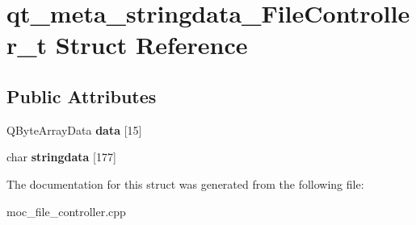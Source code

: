 \hypertarget{structqt__meta__stringdata__FileController__t}{\section{qt\-\_\-meta\-\_\-stringdata\-\_\-\-File\-Controller\-\_\-t Struct Reference}
\label{structqt__meta__stringdata__FileController__t}
}
\subsection*{Public Attributes}
\begin{DoxyCompactItemize}
\item 
\hypertarget{structqt__meta__stringdata__FileController__t_a7f037e94f93234963f2fa86545abe333}{Q\-Byte\-Array\-Data {\bfseries data} \mbox{[}15\mbox{]}}\label{structqt__meta__stringdata__FileController__t_a7f037e94f93234963f2fa86545abe333}

\item 
\hypertarget{structqt__meta__stringdata__FileController__t_a16be4e38084f14d9f9721f6619fca55d}{char {\bfseries stringdata} \mbox{[}177\mbox{]}}\label{structqt__meta__stringdata__FileController__t_a16be4e38084f14d9f9721f6619fca55d}

\end{DoxyCompactItemize}


The documentation for this struct was generated from the following file\-:\begin{DoxyCompactItemize}
\item 
moc\-\_\-file\-\_\-controller.\-cpp\end{DoxyCompactItemize}
